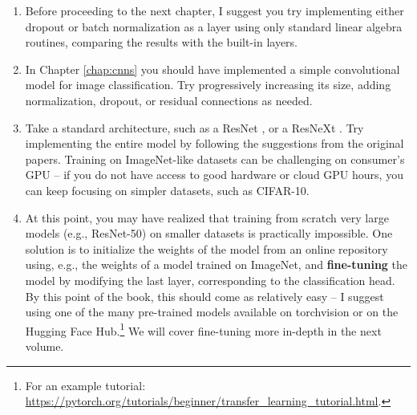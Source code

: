 \begin{enumerate}
\item Before proceeding to the next chapter, I suggest you try implementing either dropout or batch normalization as a layer using only standard linear algebra routines, comparing the results with the built-in layers.
\item In Chapter \ref{chap:cnns} you should have implemented a simple convolutional model for image classification. Try progressively increasing its size, adding normalization, dropout, or residual connections as needed.
\item Take a standard architecture, such as a ResNet \cite{he2016deep}, or a  ResNeXt \cite{liu2022convnet}. Try implementing the entire model by following the suggestions from the original papers. Training on ImageNet-like datasets can be challenging on consumer's GPU -- if you do not have access to good hardware or cloud GPU hours, you can keep focusing on simpler datasets, such as CIFAR-10.
\item At this point, you may have realized that training from scratch very large models (e.g., ResNet-50) on smaller datasets is practically impossible. One solution is to initialize the weights of the model from an online repository using, e.g., the weights of a model trained on ImageNet, and \textbf{fine-tuning} the model by modifying the last layer, corresponding to the classification head. By this point of the book, this should come as relatively easy -- I suggest using one of the many pre-trained models available on torchvision or on the Hugging Face Hub.\footnote{For an example tutorial: \url{https://pytorch.org/tutorials/beginner/transfer_learning_tutorial.html}.} We will cover fine-tuning more in-depth in the next volume.

\end{enumerate}